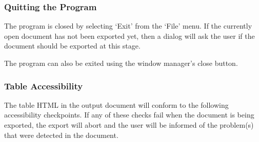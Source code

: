 \subsubsection{Quitting the Program}

The program is closed by selecting `Exit' from the `File' menu. If the
currently open document has not been exported yet, then a dialog will ask the
user if the document should be exported at this stage. 

The program can also be exited using the window manager's close button.

\subsubsection{Table Accessibility}

The table HTML in the output document will conform to the following
accessibility checkpoints. If any of these checks fail when the document
is being exported, the export will abort and the user will be informed
of the problem(s) that were detected in the document.

